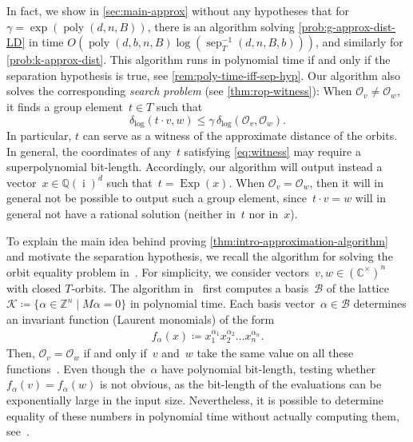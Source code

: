 \documentclass[10pt,a4paper]{article}
\theoremstyle{definition}
\DeclareMathOperator{\poly}{poly}
\DeclareMathOperator{\sep}{sep}
\DeclareMathOperator{\ii}{i}
\DeclareMathOperator{\Exp}{Exp}
\newcommand{\distLD}{\delta_{\log}}
\newcommand{\QQ}{\mathbb{Q}}
\newcommand{\CC}{\mathbb{C}}
\newcommand{\ZZ}{\mathbb{Z}}
\newcommand{\OO}{\ensuremath{\mathcal{O}}}
\numberwithin{equation}{section}
\begin{document}
In fact, we show in \cref{sec:main-approx} without any hypotheses that for~$\gamma = \exp(\poly(d,n,B))$,
there is an algorithm solving \cref{prob:g-approx-dist-LD} in time $O(\poly(d,b,n,B) \log(\sep^{-1}_T(d,n,B,b)))$,
and similarly for \cref{prob:k-approx-dist}.
This algorithm runs in polynomial time if and only if the separation hypothesis is true, see \cref{rem:poly-time-iff-sep-hyp}.
Our algorithm also solves the corresponding \emph{search problem} (see \cref{thm:rop-witness}):
When $\OO_v\ne\OO_w$, it finds a group element~$t \in T$ such that%
\begin{equation}\label{eq:witness}
  \distLD( t \cdot v, w ) \leq \gamma \, \distLD(\OO_v,\OO_w).
\end{equation}
In particular, $t$ can serve as a witness of the approximate distance of the orbits.
In general, the coordinates of any~$t$ satisfying \cref{eq:witness} may require a superpolynomial bit-length.
Accordingly, our algorithm will output instead a vector~$x\in \QQ(\ii)^d$ such that~$t = \Exp(x)$.
When $\OO_v = \OO_w$, then it will in general not be possible to output such a group element,
since~$t \cdot v = w$
will in general not have a rational solution (neither in~$t$ nor in~$x$).

To explain the main idea behind proving \cref{thm:intro-approximation-algorithm}
and motivate the separation hypothesis,
we recall the algorithm for solving the orbit equality problem in~\cite{torus}.
For simplicity, we consider vectors~$v,w\in(\CC^\times)^n$ with closed $T$-orbits.
The algorithm in~\cite{torus} first computes a basis~$\mathcal B$ of the lattice
$\mathcal{K} \coloneqq \{ \alpha\in\ZZ^n \mid M\alpha=0 \}$ in polynomial time.
Each basis vector~$\alpha \in \mathcal B$ determines an invariant function (Laurent monomials)
of the form
\begin{align*}
  f_\alpha(x) %
\coloneqq x_1^{\alpha_1} x_2^{\alpha_2}\dots x_n^{\alpha_n}.
\end{align*}
Then, $\OO_v=\OO_w$ if and only if~$v$ and~$w$ take the same value
on all these functions~\cite[Corollary~5.2]{torus}.
Even though the~$\alpha$ have polynomial bit-length,
testing whether~$f_\alpha(v) = f_\alpha(w)$ is not obvious,
as the bit-length of the evaluations can be exponentially large in the input size.
Nevertheless, it is possible to determine equality of these numbers in polynomial time
without actually computing them, see~\cite[Proposition~5.5]{torus}.
\end{document}
